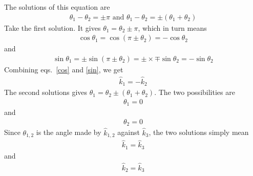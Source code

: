 \documentclass[14pt]{extarticle}
\begin{document}
The solutions of this equation are
\begin{equation}\begin{aligned}
	\theta_1 - \theta_2 = \pm \pi \text{ and } \theta_1 - \theta_2 = \pm\left(\theta_1 + \theta_2\right)
\end{aligned}\end{equation}
Take the first solution. It gives \(\theta_1 = \theta_2 \pm \pi\), which in turn means
\begin{equation}\begin{aligned}
\label{cos}
\cos \theta_1 = \cos \left(\pi \pm \theta_2\right) = -\cos \theta_2
\end{aligned}\end{equation}
and
\begin{equation}\begin{aligned}
\label{sin}
\sin \theta_1 = \pm \sin\left(\pi \pm \theta_2\right) = \pm \times \mp \sin\theta_2 = -\sin\theta_2
\end{aligned}\end{equation}
Combining eqs.~\ref{cos} and \ref{sin}, we get
\begin{equation}\begin{aligned}
\hat k_1 = - \hat k_2
\end{aligned}\end{equation}
The second solutions gives \(\theta_1 = \theta_2 \pm \left(\theta_1 + \theta_2\right)\). The two possibilities are
\begin{equation}\begin{aligned}
\theta_1 = 0
\end{aligned}\end{equation}
and
\begin{equation}\begin{aligned}
\theta_2 = 0
\end{aligned}\end{equation}
Since \(\theta_{1,2}\) is the angle made by \(\hat k_{1,2}\) against \(\hat k_3\), the two solutions simply mean
\begin{equation}\begin{aligned}
\hat k_1 = \hat k_3
\end{aligned}\end{equation}
and
\begin{equation}\begin{aligned}
\hat k_2 = \hat k_3
\end{aligned}\end{equation}
\end{document}

